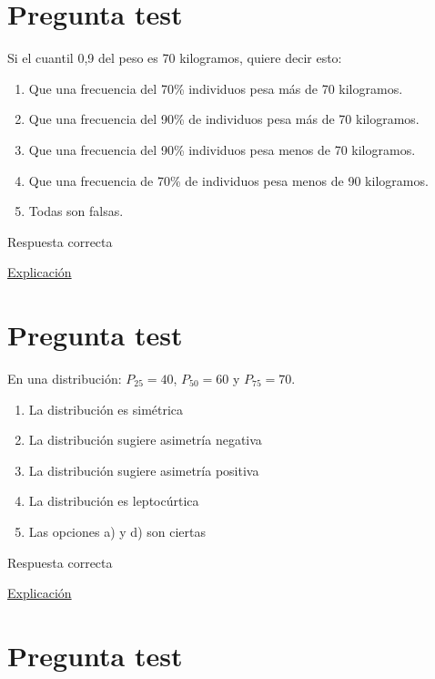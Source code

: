\documentclass[
]{book}
\providecommand{\tightlist}{%
  \setlength{\itemsep}{0pt}\setlength{\parskip}{0pt}}
\begin{document}
\hypertarget{pregunta-test-78}{%
\section{Pregunta test}\label{pregunta-test-78}}

Si el cuantil 0,9 del peso es 70 kilogramos, quiere decir esto:

\begin{enumerate}
\def\labelenumi{\alph{enumi})}
\tightlist
\item
  Que una frecuencia del 70\% individuos pesa más de 70 kilogramos.
\item
  Que una frecuencia del 90\% de individuos pesa más de 70 kilogramos.
\item
  Que una frecuencia del 90\% individuos pesa menos de 70 kilogramos.
\item
  Que una frecuencia de 70\% de individuos pesa menos de 90 kilogramos.
\item
  Todas son falsas.
\end{enumerate}

Respuesta correcta

\href{https://1fjmanzano.github.io/bioestadistica/medidas-de-posicio\%CC\%81n-dispersio\%CC\%81n-y-forma.html\#medidas-de-posicio\%CC\%81n-centrales}{Explicación}

\hypertarget{pregunta-test-79}{%
\section{Pregunta test}\label{pregunta-test-79}}

En una distribución: \(P_{25} = 40\), \(P_{50} =60\) y \(P_{75} =70\).

\begin{enumerate}
\def\labelenumi{\alph{enumi})}
\tightlist
\item
  La distribución es simétrica
\item
  La distribución sugiere asimetría negativa
\item
  La distribución sugiere asimetría positiva
\item
  La distribución es leptocúrtica
\item
  Las opciones a) y d) son ciertas
\end{enumerate}

Respuesta correcta

\href{https://1fjmanzano.github.io/bioestadistica/medidas-de-forma.html}{Explicación}

\hypertarget{pregunta-test-80}{%
\section{Pregunta test}\label{pregunta-test-80}}
\end{document}
